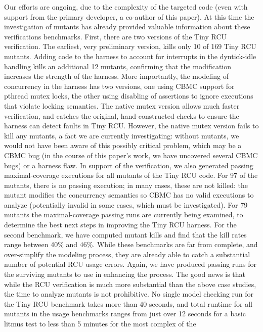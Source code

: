 \documentclass{svjour3}
\begin{document}
Our efforts are ongoing, due to the complexity of the targeted code
(even with support from the primary developer, a co-author of this
paper).  At this time the investigation of mutants has already
provided valuable information about these verifications benchmarks.
First, there are two versions of the Tiny RCU verification.  The
earliest, very preliminary version, kills only 10 of 169 Tiny RCU
mutants.  Adding code to the harness to account for interrupts in the
dyntick-idle handling kills an additional 12 mutants, confirming that
the modification increases the strength of the harness.  More
importantly, the modeling of concurrency in the harness has two
versions, one using CBMC support for pthread mutex locks, the other
using disabling of assertions to ignore executions that violate
locking semantics.  The native mutex version allows much faster
verification, and catches the original, hand-constructed checks to
ensure the harness can detect faults in Tiny RCU.  However, the native
mutex version fails to kill any mutants, a fact we are currently
investigating: without mutants, we would not have been aware of this
possibly critical problem, which may be a CBMC bug (in the course of
this paper's work, we have uncovered several CBMC bugs) or a harness
flaw.  In support of the verification, we also generated passing
maximal-coverage executions for all mutants of the Tiny RCU code.  For
97 of the mutants, there is no passing execution; in many cases, these
are not killed: the mutant modifies the concurrency semantics so CBMC
has no valid executions to analyze (potentially invalid in some cases,
which must be investigated).  For 79 mutants the maximal-coverage
passing runs are currently being examined, to determine the best next
steps in improving the Tiny RCU harness.  For the second benchmark, we
have computed mutant kills and find that the kill rates range between
40\% and 46\%.  While these benchmarks are far from complete, and
over-simplify the modeling process, they are already able to catch a
substantial number of potential RCU usage errors.  Again, we have
produced passing runs for the surviving mutants to use in enhancing
the process.  The good news is that while the RCU verification is much
more substantial than the above case studies, the time to analyze
mutants is not prohibitive.  No single model checking run for the Tiny
RCU benchmark takes more than 40 seconds, and total runtime for all
mutants in the usage benchmarks ranges from just over 12 seconds for a
basic litmus test to less than 5 minutes for the most complex of the
\end{document}
